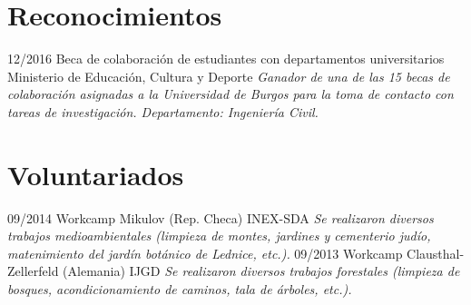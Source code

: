 \documentclass[]{friggeri-cv}
\begin{document}
\section{Reconocimientos}
\begin{entrylist}
  \entry
    {12/2016}
    {Beca de colaboración de estudiantes con departamentos universitarios\\}
    {Ministerio de Educación, Cultura y Deporte}
    {\emph{Ganador de una de las 15 becas de colaboración asignadas a la Universidad de Burgos para la toma de contacto con tareas de investigación. Departamento: Ingeniería Civil.}}
\end{entrylist}

\section{Voluntariados}
\begin{entrylist}
  \entry
    {09/2014}
    {Workcamp Mikulov (Rep. Checa)}
    {INEX-SDA}
    {\emph{Se realizaron diversos trabajos medioambientales (limpieza de montes, jardines y cementerio judío, matenimiento del jardín botánico de Lednice, etc.).}}
  \entry
    {09/2013}
    {Workcamp Clausthal-Zellerfeld (Alemania)}
    {IJGD}
    {\emph{Se realizaron diversos trabajos forestales (limpieza de bosques, acondicionamiento de caminos, tala de árboles, etc.).}}
\end{entrylist}
\end{document}
